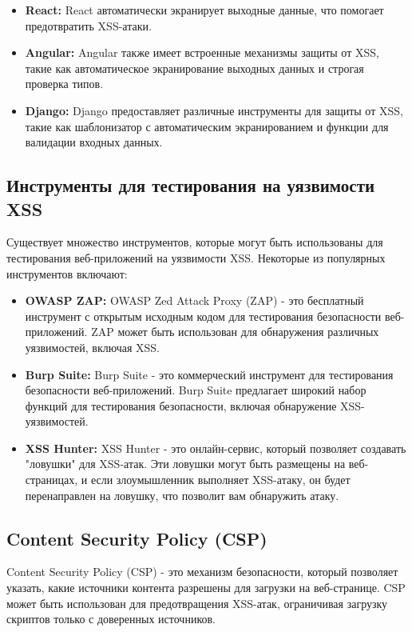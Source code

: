 \documentclass[a4paper,12pt]{diplom}
\begin{document}
	 \begin{itemize}
	 	\item \textbf{React:} React автоматически экранирует выходные данные, что помогает предотвратить XSS-атаки.
	 	\item \textbf{Angular:} Angular также имеет встроенные механизмы защиты от XSS, такие как автоматическое экранирование выходных данных и строгая проверка типов.
	 	\item \textbf{Django:} Django предоставляет различные инструменты для защиты от XSS, такие как шаблонизатор с автоматическим экранированием и функции для валидации входных данных.
	 \end{itemize}
	 
	 \subsection{Инструменты для тестирования на уязвимости XSS}
	 
	 Существует множество инструментов, которые могут быть использованы для тестирования веб-приложений на уязвимости XSS. Некоторые из популярных инструментов включают:
	 
	 \begin{itemize}
	 	\item \textbf{OWASP ZAP:} OWASP Zed Attack Proxy (ZAP) - это бесплатный инструмент с открытым исходным кодом для тестирования безопасности веб-приложений. ZAP может быть использован для обнаружения различных уязвимостей, включая XSS.
	 	\item \textbf{Burp Suite:} Burp Suite - это коммерческий инструмент для тестирования безопасности веб-приложений. Burp Suite предлагает широкий набор функций для тестирования безопасности, включая обнаружение XSS-уязвимостей.
	 	\item \textbf{XSS Hunter:} XSS Hunter - это онлайн-сервис, который позволяет создавать "ловушки" для XSS-атак. Эти ловушки могут быть размещены на веб-страницах, и если злоумышленник выполняет XSS-атаку, он будет перенаправлен на ловушку, что позволит вам обнаружить атаку.
	 \end{itemize}
	 
	 \subsection{Content Security Policy (CSP)}
	 
	 Content Security Policy (CSP) - это механизм безопасности, который позволяет указать, какие источники контента разрешены для загрузки на веб-странице. CSP может быть использован для предотвращения XSS-атак, ограничивая загрузку скриптов только с доверенных источников.
	 
\end{document}
